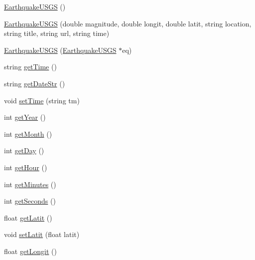 \begin{DoxyCompactItemize}
\item 
\mbox{\hyperlink{classbridges_1_1_earthquake_u_s_g_s_a540ae74c248da179fbbd182b843a14e0}{Earthquake\+U\+S\+GS}} ()
\item 
\mbox{\hyperlink{classbridges_1_1_earthquake_u_s_g_s_a9c7f7aec2ddc173660a7015b90c7b7b0}{Earthquake\+U\+S\+GS}} (double magnitude, double longit, double latit, string location, string title, string url, string time)
\item 
\mbox{\hyperlink{classbridges_1_1_earthquake_u_s_g_s_aa52d05b3119c6a4e45867dc4aaeba59e}{Earthquake\+U\+S\+GS}} (\mbox{\hyperlink{classbridges_1_1_earthquake_u_s_g_s}{Earthquake\+U\+S\+GS}} $\ast$eq)
\item 
string \mbox{\hyperlink{classbridges_1_1_earthquake_u_s_g_s_a8d142b4ea194c5d839015ee7850a12c6}{get\+Time}} ()
\item 
string \mbox{\hyperlink{classbridges_1_1_earthquake_u_s_g_s_a4d3be95771696b632e25f7e296884985}{get\+Date\+Str}} ()
\item 
void \mbox{\hyperlink{classbridges_1_1_earthquake_u_s_g_s_a70d79cd5c3666b8a32b1d45d7364054b}{set\+Time}} (string tm)
\item 
int \mbox{\hyperlink{classbridges_1_1_earthquake_u_s_g_s_ae833038db474d72c6d76b3efe6b4a8fa}{get\+Year}} ()
\item 
int \mbox{\hyperlink{classbridges_1_1_earthquake_u_s_g_s_ad254b6e777b631f2597ef8c550da944c}{get\+Month}} ()
\item 
int \mbox{\hyperlink{classbridges_1_1_earthquake_u_s_g_s_a4513be14d482242f57dd04ded0691fc2}{get\+Day}} ()
\item 
int \mbox{\hyperlink{classbridges_1_1_earthquake_u_s_g_s_a831e45a3b46e49fa4e0c2beeafbec7d1}{get\+Hour}} ()
\item 
int \mbox{\hyperlink{classbridges_1_1_earthquake_u_s_g_s_af32892b6f94893ff02985a9721e1e5b2}{get\+Minutes}} ()
\item 
int \mbox{\hyperlink{classbridges_1_1_earthquake_u_s_g_s_a65a4a0cbf8916a2c3a5a49ce8d28d15a}{get\+Seconds}} ()
\item 
float \mbox{\hyperlink{classbridges_1_1_earthquake_u_s_g_s_abbae7f51eb9905e8ddada88d6127bf98}{get\+Latit}} ()
\item 
void \mbox{\hyperlink{classbridges_1_1_earthquake_u_s_g_s_a143678bb9dd697f82dcb260ddab78f82}{set\+Latit}} (float latit)
\item 
float \mbox{\hyperlink{classbridges_1_1_earthquake_u_s_g_s_a63c2fed8b27dace2b988dd9c0c937d70}{get\+Longit}} ()

\end{DoxyCompactItemize}
